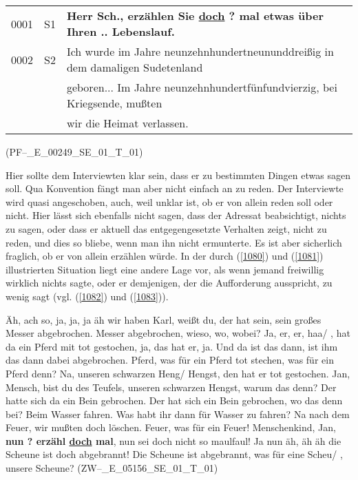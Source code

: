 {\begin{exe}
	\ex\label{1081} 
	\scriptsize
    \begin{tabular}[t]{lll}
	0001 & S1 &	\textbf{Herr Sch., erzählen Sie \underline{doch} ? mal etwas über Ihren .. Lebenslauf.}\\
	0002 & S2 & Ich wurde im Jahre neunzehnhundertneununddreißig in dem damaligen Sudetenland \\
	& & geboren... Im Jahre neunzehnhundertfünfundvierzig, bei Kriegsende, mußten \\
	& & wir die Heimat verlassen.
	\end{tabular}
	\hfill\hbox{(PF--\_E\_00249\_SE\_01\_T\_01)} 					       
\end{exe}
Hier sollte dem Interviewten klar sein, dass er zu bestimmten Dingen etwas sagen soll. Qua Konvention fängt man aber nicht einfach an zu reden. Der Interviewte wird quasi \glq angeschoben\grq {}, auch, weil unklar ist, ob er von allein reden soll oder nicht. Hier lässt sich ebenfalls nicht sagen, dass der Adressat beabsichtigt, nichts zu sagen, oder dass er aktuell das entgegengesetzte Verhalten zeigt, nicht zu reden, und dies so bliebe, wenn man ihn nicht ermunterte. Es ist aber sicherlich fraglich, ob er von allein erzählen würde. In der durch (\ref{1080}) und (\ref{1081}) illustrierten Situation liegt eine andere Lage vor, als wenn jemand freiwillig wirklich nichts sagte, oder er demjenigen, der die Aufforderung ausspricht, zu wenig sagt (vgl. (\ref{1082}) und (\ref{1083})).

\begin{exe}
	\ex\label{1082} 
	\scriptsize
    \glq Äh, ach so, ja, ja, ja äh wir haben Karl, weißt du, der hat sein, sein großes Messer abgebrochen.\grq {} \glq Messer abgebrochen, wieso, wo, 			wobei?\grq {} \glq Ja, er, er, haa/ , hat da ein Pferd mit tot gestochen, ja, das hat er, ja. Und da ist das dann, ist ihm das dann dabei abgebrochen.		\grq {} \glq Pferd, was für ein Pferd tot stechen, was für ein Pferd denn?\grq {} \glq Na, unseren schwarzen Heng/ Hengst, den hat er tot gestochen.		\grq {} \glq Jan, Mensch, bist du des Teufels, unseren schwarzen Hengst, warum das denn?\grq {} \glq Der hatte sich da ein Bein gebrochen.\grq {} \glq 		Der hat sich ein Bein gebrochen, wo das denn bei?\grq {} \glq Beim Wasser fahren.\grq {} \glq Was habt ihr dann für Wasser zu fahren?\grq {} \glq Na 		nach dem Feuer, wir mußten doch löschen.\grq {} \glq Feuer, was für ein Feuer! Menschenkind, Jan, \textbf{nun ? erzähl \underline{doch} mal}, nun sei 		doch nicht so maulfaul!\grq {} \glq Ja nun äh, äh äh die Scheune ist doch abgebrannt!\grq {} \glq Die Scheune ist abgebrannt, was für eine Scheu/ , 		unsere Scheune?\grq {} 		  
	\hfill\hbox{(ZW--\_E\_05156\_SE\_01\_T\_01)} 					     
\end{exe}
					     
}
